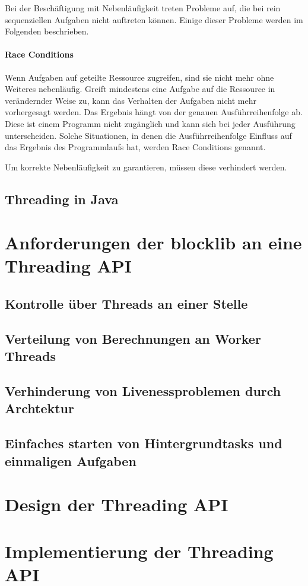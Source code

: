 \documentclass[parskip=half,twoside,BCOR=2cm,11pt,DIV=10]{scrreprt}
\begin{document}
Bei der Beschäftigung mit Nebenläufigkeit treten Probleme auf, die bei rein sequenziellen Aufgaben nicht auftreten können. Einige dieser Probleme werden im Folgenden beschrieben.

\paragraph{Race Conditions} Wenn Aufgaben auf geteilte Ressource zugreifen, sind sie nicht mehr ohne Weiteres nebenläufig. Greift mindestens eine Aufgabe auf die Ressource in verändernder Weise zu, kann das Verhalten der Aufgaben nicht mehr vorhergesagt werden. Das Ergebnis hängt von der genauen Ausführreihenfolge ab. Diese ist einem Programm nicht zugänglich und kann sich bei jeder Ausführung unterscheiden. Solche Situationen, in denen die Ausführreihenfolge Einfluss auf das Ergebnis des Programmlaufs hat, werden Race Conditions genannt.

Um korrekte Nebenläufigkeit zu garantieren, müssen diese verhindert werden.
\subsection{Threading in Java}
\section{Anforderungen der blocklib an eine Threading API}
\subsection{Kontrolle über Threads an einer Stelle}
\subsection{Verteilung von Berechnungen an Worker Threads}
\subsection{Verhinderung von Livenessproblemen durch Archtektur}
\subsection{Einfaches starten von Hintergrundtasks und einmaligen Aufgaben}
\section{Design der Threading API}
\section{Implementierung der Threading API}
\end{document}
